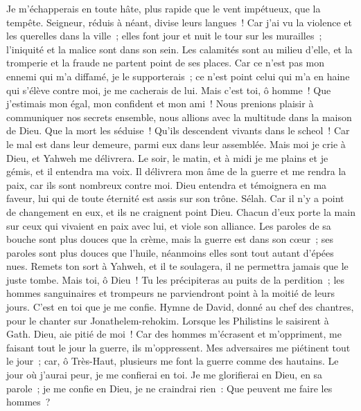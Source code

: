 \begin{multicols}{2}
Je m'échapperais en toute hâte, plus rapide que le vent impétueux, que la tempête.
Seigneur, réduis à néant, divise leurs langues~! Car j'ai vu la violence et les querelles dans la ville~;
elles font jour et nuit le tour sur les murailles~; l'iniquité et la malice sont dans son sein.
Les calamités sont au milieu d'elle, et la tromperie et la fraude ne partent point de ses places.
Car ce n'est pas mon ennemi qui m'a diffamé, je le supporterais~; ce n'est point celui qui m'a en haine qui s'élève contre moi, je me cacherais de lui.
Mais c'est toi, ô homme~! Que j'estimais mon égal, mon confident et mon ami~!
Nous prenions plaisir à communiquer nos secrets ensemble, nous allions avec la multitude dans la maison de Dieu.
Que la mort les séduise~! Qu'ils descendent vivants dans le scheol~! Car le mal est dans leur demeure, parmi eux dans leur assemblée.
Mais moi je crie à Dieu, et Yahweh me délivrera.
Le soir, le matin, et à midi je me plains et je gémis, et il entendra ma voix.
Il délivrera mon âme de la guerre et me rendra la paix, car ils sont nombreux contre moi.
Dieu entendra et témoignera en ma faveur, lui qui de toute éternité est assis sur son trône. Sélah. Car il n'y a point de changement en eux, et ils ne craignent point Dieu.
Chacun d'eux porte la main sur ceux qui vivaient en paix avec lui, et viole son alliance.
Les paroles de sa bouche sont plus douces que la crème, mais la guerre est dans son cœur~; ses paroles sont plus douces que l'huile, néanmoins elles sont tout autant d'épées nues.
Remets ton sort à Yahweh, et il te soulagera, il ne permettra jamais que le juste tombe.
Mais toi, ô Dieu~! Tu les précipiteras au puits de la perdition~; les hommes sanguinaires et trompeurs ne parviendront point à la moitié de leurs jours. C'est en toi que je me confie.
\VerseOne{}Hymne de David, donné au chef des chantres, pour le chanter sur Jonathelem-rehokim. Lorsque les Philistins le saisirent à Gath.
Dieu, aie pitié de moi~! Car des hommes m'écrasent et m'oppriment, me faisant tout le jour la guerre, ils m'oppressent.
Mes adversaires me piétinent tout le jour~; car, ô Très-Haut, plusieurs me font la guerre comme des hautains.
Le jour où j'aurai peur, je me confierai en toi.
Je me glorifierai en Dieu, en sa parole~; je me confie en Dieu, je ne craindrai rien~: Que peuvent me faire les hommes~?

\end{multicols}
